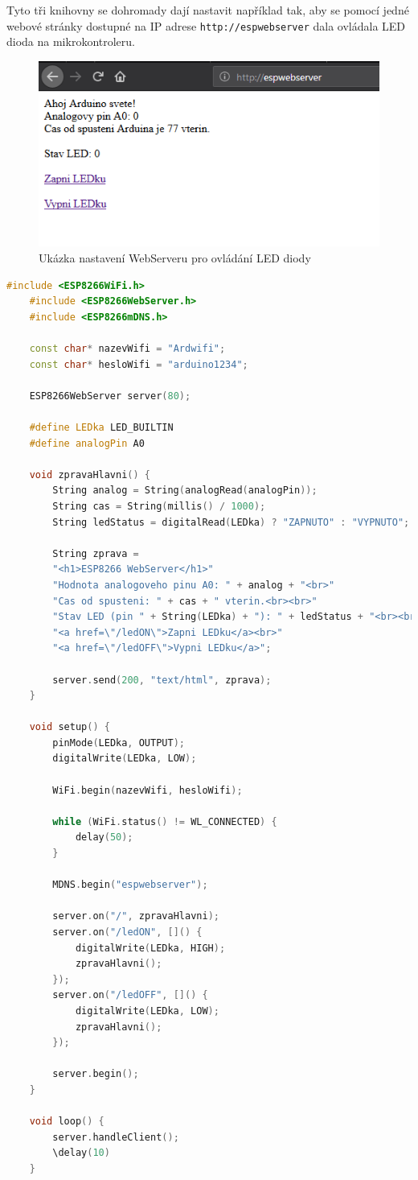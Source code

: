 Tyto tři knihovny se dohromady dají nastavit například tak, aby se pomocí jedné webové stránky dostupné na IP adrese \texttt{http://espwebserver} dala ovládala LED dioda na mikrokontroleru.

\begin{figure}[H]
	\centering
	\includegraphics[width=0.7\linewidth]{images/ESPWebserverUkazka}
	\caption{Ukázka nastavení WebServeru pro ovládání LED diody \cite{NavodNaESPWebServerDratek}}
	\label{fig:espwebserverukazka}
\end{figure}

\begin{lstlisting}[language=C++, caption={Nastavení ESP8266 WebServeru pro ovládání LED diody \cite{NavodNaESPWebServerDratek}}, label={lst:NastaveniWebServeru}]
	#include <ESP8266WiFi.h>
	#include <ESP8266WebServer.h>
	#include <ESP8266mDNS.h>

	const char* nazevWifi = "Ardwifi";
	const char* hesloWifi = "arduino1234";

	ESP8266WebServer server(80);

	#define LEDka LED_BUILTIN
	#define analogPin A0

	void zpravaHlavni() {
		String analog = String(analogRead(analogPin));
		String cas = String(millis() / 1000);
		String ledStatus = digitalRead(LEDka) ? "ZAPNUTO" : "VYPNUTO";

		String zprava =
		"<h1>ESP8266 WebServer</h1>"
		"Hodnota analogoveho pinu A0: " + analog + "<br>"
		"Cas od spusteni: " + cas + " vterin.<br><br>"
		"Stav LED (pin " + String(LEDka) + "): " + ledStatus + "<br><br>"
		"<a href=\"/ledON\">Zapni LEDku</a><br>"
		"<a href=\"/ledOFF\">Vypni LEDku</a>";

		server.send(200, "text/html", zprava);
	}

	void setup() {
		pinMode(LEDka, OUTPUT);
		digitalWrite(LEDka, LOW);

		WiFi.begin(nazevWifi, hesloWifi);

		while (WiFi.status() != WL_CONNECTED) {
			delay(50);
		}

		MDNS.begin("espwebserver");

		server.on("/", zpravaHlavni);
		server.on("/ledON", []() {
			digitalWrite(LEDka, HIGH);
			zpravaHlavni();
		});
		server.on("/ledOFF", []() {
			digitalWrite(LEDka, LOW);
			zpravaHlavni();
		});

		server.begin();
	}

	void loop() {
		server.handleClient();
		\delay(10)
	}
\end{lstlisting}

